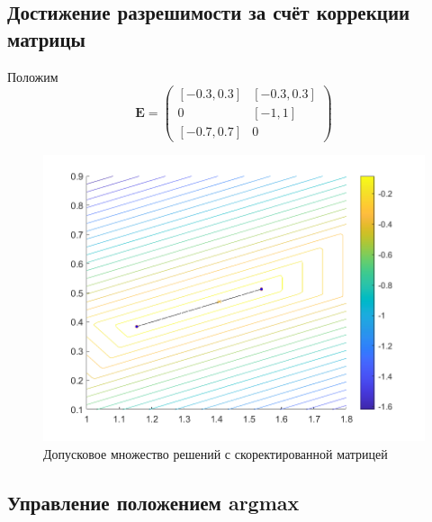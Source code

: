 \subsection{Достижение разрешимости за счёт коррекции матрицы}
Положим 
\begin{equation}
    \mathbf{E}=
    \begin{pmatrix}
[-0.3, 0.3]  &  [-0.3, 0.3] \\
0  &  [-1, 1] \\
[-0.7, 0.7]  &  0
\end{pmatrix}
\end{equation}
\begin{figure}[H] \label{MatrixCorrSet}
\centering
\includegraphics[width=\textwidth]{Graphics/matrixCorr.png}
\caption{Допусковое множество решений с скоректированной матрицей} 
\end{figure}
\subsection{Управление положением argmax}
